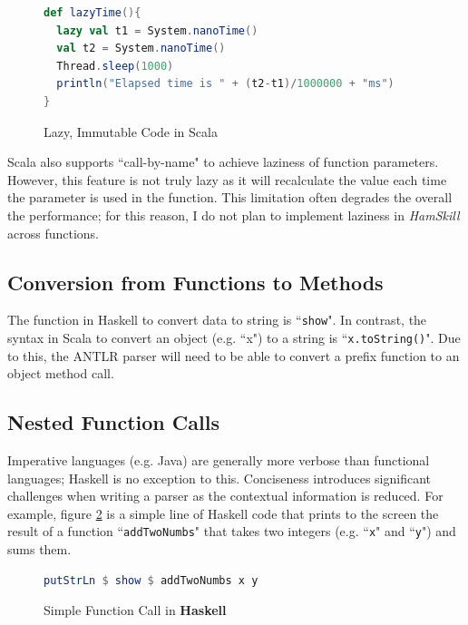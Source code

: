 \documentclass{report}
\begin{document}
\begin{figure}[H]
\begin{mdframed}
\begin{lstlisting}[language=Scala]
def lazyTime(){
  lazy val t1 = System.nanoTime()
  val t2 = System.nanoTime()
  Thread.sleep(1000)
  println("Elapsed time is " + (t2-t1)/1000000 + "ms")
}
\end{lstlisting}
\end{mdframed}
\caption{Lazy, Immutable Code in Scala}\label{fig:lazyImmutabilityInScala}
\end{figure}

Scala also supports ``call-by-name" to achieve laziness of function parameters.  However, this feature is not truly lazy as it will recalculate the value each time the parameter is used in the function.  This limitation often degrades the overall the performance; for this reason, I do not plan to implement laziness in \emph{HamSkill} across functions.



\subsection{Conversion from Functions to Methods}

The function in Haskell to convert data to string is ``{\tt show}". In contrast, the syntax in Scala to convert an object (e.g. ``x") to a string is ``{\tt x.toString()}".  Due to this, the ANTLR parser will need to be able to convert a prefix function to an object method call.

\subsection{Nested Function Calls}\label{sec:nestedFunctionCalls}

Imperative languages (e.g. Java) are generally more verbose than functional languages; Haskell is no exception to this.  Conciseness introduces significant challenges when writing a parser as the contextual information is reduced.  For example, figure \ref{fig:addTwoNumbersHaskell} is a simple line of Haskell code that prints to the screen the result of a function ``{\tt addTwoNumbs}" that takes two integers (e.g. ``{\tt x}" and ``{\tt y}") and sums them. 

\begin{figure}[H]
\begin{mdframed}
\begin{lstlisting}[language=Haskell]
putStrLn $ show $ addTwoNumbs x y
\end{lstlisting}
\end{mdframed}
\caption{Simple Function Call in \textbf{Haskell}}\label{fig:addTwoNumbersHaskell}
\end{figure}
\end{document}
